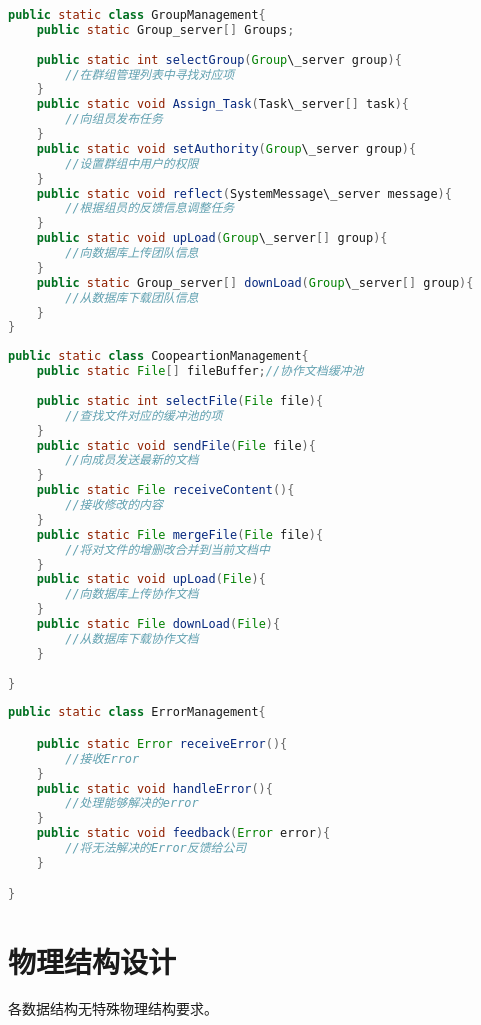 \begin{lstlisting}[language=Java, caption=团队管理类]
public static class GroupManagement{
    public static Group_server[] Groups;
    
    public static int selectGroup(Group\_server group){
        //在群组管理列表中寻找对应项
    }
    public static void Assign_Task(Task\_server[] task){
        //向组员发布任务
    }
    public static void setAuthority(Group\_server group){
        //设置群组中用户的权限
    }
    public static void reflect(SystemMessage\_server message){
        //根据组员的反馈信息调整任务
    }
    public static void upLoad(Group\_server[] group){
        //向数据库上传团队信息
    }
    public static Group_server[] downLoad(Group\_server[] group){
        //从数据库下载团队信息
    }
}
\end{lstlisting}

\begin{lstlisting}[language=Java, caption=在线协作类]
public static class CoopeartionManagement{
    public static File[] fileBuffer;//协作文档缓冲池
    
    public static int selectFile(File file){
        //查找文件对应的缓冲池的项
    }
    public static void sendFile(File file){
        //向成员发送最新的文档
    }
    public static File receiveContent(){
        //接收修改的内容
    }
    public static File mergeFile(File file){
        //将对文件的增删改合并到当前文档中
    }
    public static void upLoad(File){
        //向数据库上传协作文档
    }
    public static File downLoad(File){
        //从数据库下载协作文档
    }
    
} 
\end{lstlisting}
\begin{lstlisting}[language=Java, caption=在线协作类]
public static class ErrorManagement{

    public static Error receiveError(){
        //接收Error
    }
    public static void handleError(){
        //处理能够解决的error
    }
    public static void feedback(Error error){
        //将无法解决的Error反馈给公司
    }

} 
\end{lstlisting}

    \section{物理结构设计}
        各数据结构无特殊物理结构要求。
